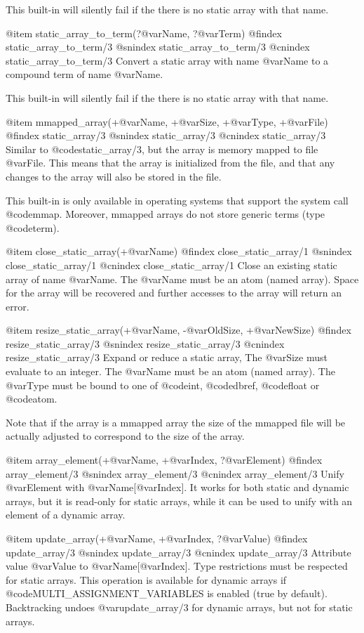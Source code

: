 {{{{{{This built-in will silently fail if the there is no static array with
that name.

@item static_array_to_term(?@var{Name}, ?@var{Term})
@findex static_array_to_term/3
@snindex static_array_to_term/3
@cnindex static_array_to_term/3
Convert a static array with name
@var{Name} to a compound term of name @var{Name}.

This built-in will silently fail if the there is no static array with
that name.

@item mmapped_array(+@var{Name}, +@var{Size}, +@var{Type}, +@var{File})
@findex static_array/3
@snindex static_array/3
@cnindex static_array/3
Similar to @code{static_array/3}, but the array is memory mapped to file
@var{File}. This means that the array is initialized from the file, and
that any changes to the array will also be stored in the file. 

This built-in is only available in operating systems that support the
system call @code{mmap}. Moreover, mmapped arrays do not store generic
terms (type @code{term}).

@item close_static_array(+@var{Name})
@findex close_static_array/1
@snindex close_static_array/1
@cnindex close_static_array/1
Close an existing static array of name @var{Name}. The @var{Name} must
be an atom (named array). Space for the array will be recovered and
further accesses to the array will return an error. 

@item resize_static_array(+@var{Name}, -@var{OldSize}, +@var{NewSize})
@findex resize_static_array/3
@snindex resize_static_array/3
@cnindex resize_static_array/3
Expand or reduce a static array, The @var{Size} must evaluate to an
integer. The @var{Name} must be an atom (named array). The @var{Type}
must be bound to one of @code{int}, @code{dbref}, @code{float} or
@code{atom}.

Note that if the array is a mmapped array the size of the mmapped file
will be actually adjusted to correspond to the size of the array.

@item array_element(+@var{Name}, +@var{Index}, ?@var{Element})
@findex array_element/3
@snindex array_element/3
@cnindex array_element/3
Unify @var{Element} with @var{Name}[@var{Index}]. It works for both
static and dynamic arrays, but it is read-only for static arrays, while
it can be used to unify with an element of a dynamic array.

@item update_array(+@var{Name}, +@var{Index}, ?@var{Value}) 
@findex update_array/3
@snindex update_array/3
@cnindex update_array/3
Attribute value @var{Value} to @var{Name}[@var{Index}]. Type
restrictions must be respected for static arrays. This operation is
available for dynamic arrays if @code{MULTI_ASSIGNMENT_VARIABLES} is
enabled (true by default). Backtracking undoes @var{update_array/3} for
dynamic arrays, but not for static arrays.

}}}}}}
